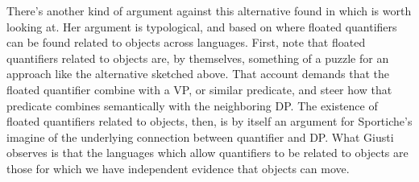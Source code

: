 There's another kind of argument against this alternative found in \citet{Giusti:1990, Giusti:1990b} which is worth looking at. Her argument is typological, and based on where floated quantifiers can be found related to objects across languages. First, note that floated quantifiers related to objects are, by themselves, something of a puzzle for an approach like the alternative sketched above. That account demands that the floated quantifier combine with a VP, or similar predicate, and steer how that predicate combines semantically with the neighboring DP. The existence of floated quantifiers related to objects, then, is by itself an argument for Sportiche's imagine of the underlying connection between quantifier and DP. What Giusti observes is that the languages which allow quantifiers to be related to objects are those for which we have independent evidence that objects can move.

